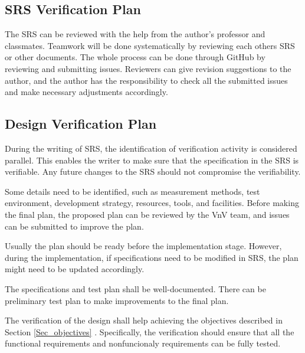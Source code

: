 \documentclass[12pt, titlepage]{article}
\begin{document}
\subsection{SRS Verification Plan}

The SRS can be reviewed with the help from the author's professor and
classmates. Teamwork will be done systematically by reviewing each others SRS
or other documents. The whole process can be done through GitHub by reviewing
and submitting issues. Reviewers can give revision suggestions to the author, and
the author has the responsibility to check all the submitted issues and make
necessary adjustments accordingly.

\subsection{Design Verification Plan}

During the writing of SRS, the identification of verification activity is
considered parallel. This enables the writer to make sure that the
specification in the SRS is verifiable. Any future changes to the SRS should not
compromise
the verifiability. 

Some details need to be identified, such as measurement methods, test
environment, development strategy, resources, tools, and facilities. Before
making the final plan, the proposed plan can be reviewed by the VnV team, and
issues can be submitted to improve the plan.

Usually the plan should be ready before the implementation stage. However,
during the implementation, if specifications need to be modified in SRS, the
plan
might need to be updated accordingly.

The specifications and test plan shall be well-documented. There can be
preliminary test plan to make improvements to the final plan.



The verification of the design shall help achieving the objectives described in
Section \ref{Sec_objectives} \cite{Michalski2019SystVnv}. Specifically,
the verification should ensure that all the functional requirements and
nonfuncionaly requirements can be fully tested.
\end{document}
